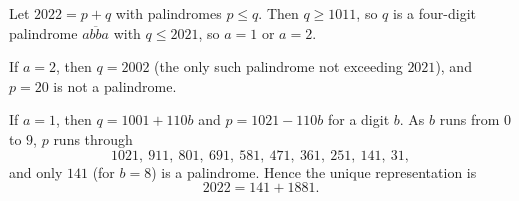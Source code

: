 Let $2022=p+q$ with palindromes $p\le q$. Then $q\ge1011$, so $q$ is a four-digit palindrome $\overline{abba}$ with $q\le2021$, so $a=1$ or $a=2$.

If $a=2$, then $q=2002$ (the only such palindrome not exceeding $2021$), and $p=20$ is not a palindrome.

If $a=1$, then $q=1001+110b$ and $p=1021-110b$ for a digit $b$. As $b$ runs from $0$ to $9$, $p$ runs through
\[1021,\ 911,\ 801,\ 691,\ 581,\ 471,\ 361,\ 251,\ 141,\ 31,\]
and only $141$ (for $b=8$) is a palindrome. Hence the unique representation is
\[\boxed{2022=141+1881}.\]
